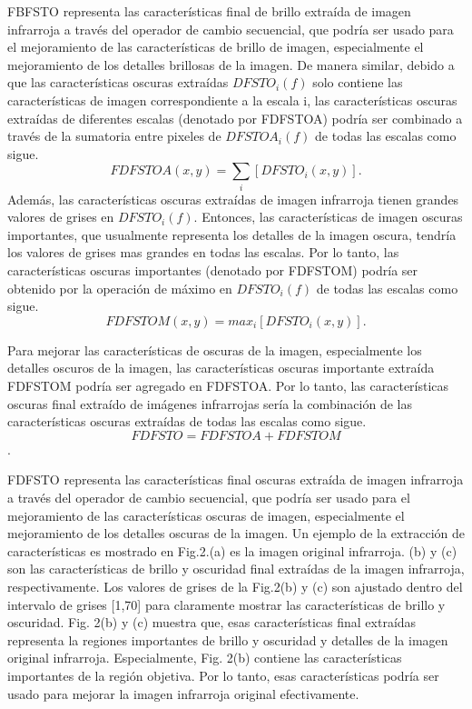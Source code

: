 \documentclass[a4paper, 11 pt, conference]{ieeeconf}      %
\begin{document}
FBFSTO representa las caracter\'isticas final de brillo extra\'ida de imagen infrarroja a trav\'es del operador de cambio secuencial, que podr\'ia ser usado para el mejoramiento de las caracter\'isticas de brillo de imagen, especialmente el mejoramiento de los detalles brillosas de la imagen.
De manera similar, debido a que las caracter\'isticas oscuras extra\'idas  $DFSTO_i(f)$ solo contiene las caracter\'isticas de imagen correspondiente a la escala i, las caracter\'isticas oscuras extra\'idas de diferentes escalas (denotado por FDFSTOA) podr\'ia ser combinado a trav\'es de la sumatoria entre pixeles de $DFSTOA_i(f)$ de todas las escalas como sigue.
$$
FDFSTOA(x,y) = \sum_{i} [DFSTO_i(x,y)].
$$
Adem\'as, las caracter\'isticas oscuras extra\'idas de imagen infrarroja tienen grandes valores de grises en $DFSTO_i(f)$. Entonces, las caracter\'isticas de imagen oscuras importantes, que usualmente representa los detalles de la imagen oscura, tendr\'ia los valores de grises mas grandes en todas las escalas. Por lo tanto, las caracter\'isticas oscuras importantes (denotado por FDFSTOM) podr\'ia ser obtenido por la operaci\'on de m\'aximo en $DFSTO_i(f)$ de todas las escalas como sigue.
$$
FDFSTOM(x,y) = max_i[DFSTO_i(x,y)].
$$

Para mejorar las caracter\'isticas de oscuras de la imagen, especialmente los detalles oscuros de la imagen, las caracter\'isticas oscuras importante extra\'ida FDFSTOM podr\'ia ser agregado en FDFSTOA. Por lo tanto, las caracter\'isticas oscuras final extra\'ido de im\'agenes infrarrojas ser\'ia la combinaci\'on de las caracter\'isticas oscuras extra\'idas de todas las escalas como sigue.
$$FDFSTO = FDFSTOA + FDFSTOM$$.

FDFSTO representa las caracter\'isticas final oscuras extra\'ida de imagen infrarroja a trav\'es del operador de cambio secuencial, que podr\'ia ser usado para el mejoramiento de las caracter\'isticas oscuras de imagen, especialmente el mejoramiento de los detalles oscuras de la imagen.
Un ejemplo de la extracci\'on de caracter\'isticas es mostrado en Fig.2.(a) es la imagen original infrarroja. (b) y (c) son las caracter\'isticas de brillo y oscuridad final extra\'idas de la imagen infrarroja, respectivamente. Los valores de grises de la Fig.2(b) y (c) son ajustado dentro del intervalo de grises [1,70] para claramente mostrar las caracter\'isticas de brillo y oscuridad. Fig. 2(b) y (c) muestra que, esas caracter\'isticas final extra\'idas representa la regiones importantes de brillo y oscuridad y detalles de la imagen original infrarroja. Especialmente, Fig. 2(b) contiene las caracter\'isticas importantes de la regi\'on objetiva. Por lo tanto, esas caracter\'isticas podr\'ia ser usado para mejorar la imagen infrarroja original efectivamente.
\end{document}
